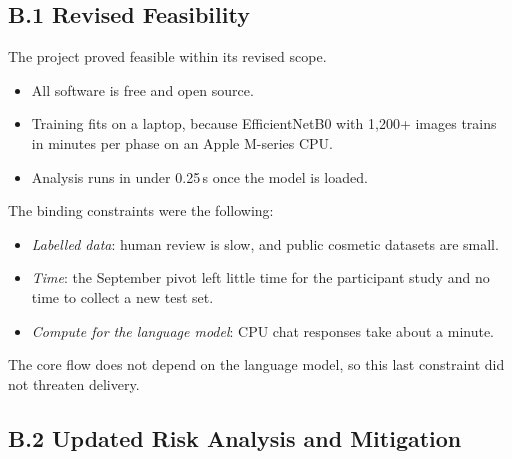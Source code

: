 \subsection*{B.1 Revised Feasibility}

The project proved feasible within its revised scope.
\begin{itemize}
  \item All software is free and open source.
  \item Training fits on a laptop, because EfficientNetB0 with 1,200+ images trains in minutes per phase on an Apple M-series CPU.
  \item Analysis runs in under 0.25\,s once the model is loaded.
\end{itemize}

The binding constraints were the following:
\begin{itemize}
  \item \emph{Labelled data}: human review is slow, and public cosmetic datasets are small.
  \item \emph{Time}: the September pivot left little time for the participant study and no time to collect a new test set.
  \item \emph{Compute for the language model}: CPU chat responses take about a minute.
\end{itemize}
The core flow does not depend on the language model, so this last constraint did not threaten delivery.

\subsection*{B.2 Updated Risk Analysis and Mitigation}


